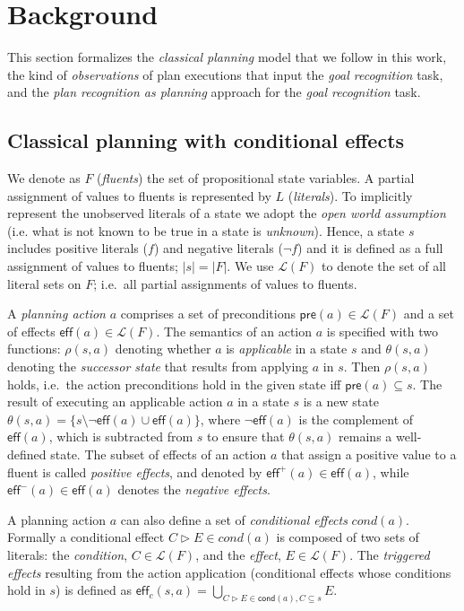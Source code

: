 \documentclass[letterpaper]{article} %
\newcommand{\pre}{\mathsf{pre}}     %
\newcommand{\eff}{\mathsf{eff}}     %
\newcommand{\cond}{\mathsf{cond}}   %
\begin{document}
\section{Background}
\label{sec:background}
This section formalizes the {\em classical planning} model that we follow in this work, the kind of {\em observations} of plan executions that input the {\em goal recognition} task, and the {\em plan recognition as planning} approach for the {\em goal recognition} task.  

\subsection{Classical planning with conditional effects}
We denote as $F$ ({\em fluents}) the set of  propositional state variables. A partial assignment of values to fluents is represented by $L$ ({\em literals}). To implicitly represent the unobserved literals of a state we adopt the \emph{open world assumption} (i.e. what is not known to be true in a state is {\em unknown}). Hence, a state $s$ includes positive literals ($f$) and negative literals ($\neg f$) and it is defined as a full assignment of values to fluents; $|s|=|F|$. We use $\mathcal{L}(F)$ to denote the set of all literal sets on $F$; i.e.~all partial assignments of values to fluents.

A {\em planning action} $a$ comprises a set of preconditions $\pre(a)\in\mathcal{L}(F)$ and a set of effects $\eff(a)\in\mathcal{L}(F)$. The semantics of an action $a$ is specified with two functions: $\rho(s,a)$ denoting whether $a$ is {\em applicable} in a state $s$ and $\theta(s,a)$ denoting the {\em successor state} that results from applying $a$ in $s$. Then $\rho(s,a)$ holds, i.e.~the action preconditions hold in the given state iff $\pre(a)\subseteq s$. The result of executing an applicable action $a$ in a state $s$ is a new state $\theta(s,a)=\{s\setminus \neg\eff(a)\cup\eff(a)\}$, where $\neg\eff(a)$ is the complement of $\eff(a)$, which is subtracted from $s$ to ensure that $\theta(s,a)$ remains a well-defined state. The subset of effects of an action $a$ that assign a positive value to a fluent is called {\em positive effects}, and denoted by $\eff^+(a)\in \eff(a)$, while $\eff^-(a)\in \eff(a)$ denotes the {\em negative effects}.

A planning action $a$ can also define a set of {\em conditional effects} $cond(a)$. Formally a conditional effect $C\rhd E\in cond(a)$ is composed of two sets of literals: the {\em condition}, $C\in\mathcal{L}(F)$, and the {\em effect}, $E\in\mathcal{L}(F)$. The {\em triggered effects} resulting from the action application (conditional effects whose conditions hold in $s$) is defined as $\eff_c(s,a)=\bigcup_{C\rhd E\in\cond(a),C\subseteq s} E$.
\end{document}
